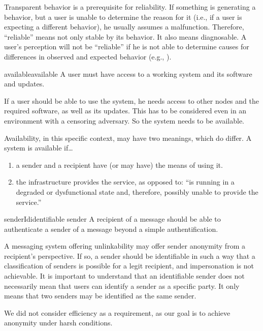 Transparent behavior is a prerequisite for reliability. If something is generating a  behavior, but a user is unable to determine the reason for it (i.e., if a user is expecting a different behavior), he usually assumes a malfunction. Therefore, ``reliable'' means not only stable by its behavior. It also means diagnosable. A user's perception will not be ``reliable'' if he is not able to determine causes for differences in observed and expected behavior (e.g., \cite{nicholson2003assessing}).

\begin{requirement}{available}{available}
	A user must have access to a working system and its software and updates.
\end{requirement}

If a user should be able to use the system, he needs access to other nodes and the required software, as well as its updates. This has to be considered even in an environment with a censoring adversary. So the system needs to be available.

Availability, in this specific context, may have two meanings, which do differ. A system is available if\ldots
\begin{enumerate}
	\item a sender and a recipient have (or may have) the means of using it.
	\item the infrastructure provides the service, as opposed to: ``is running in a degraded or dysfunctional state and, therefore, possibly unable to provide the service.''
\end{enumerate}

\begin{requirement}{senderId}{identifiable sender}
	A recipient of a message should be able to authenticate a sender of a message beyond a simple authentification.
\end{requirement}

A messaging system offering unlinkability may offer sender anonymity from a recipient's perspective. If so, a sender should be identifiable in such a way that a classification of senders is possible for a legit recipient, and impersonation is not achievable. It is important to understand that an identifiable sender does not necessarily mean that users can identify a sender as a specific party. It only means that two senders may be identified as the same sender.

We did not consider efficiency as a requirement, as our goal is to achieve anonymity under harsh conditions. 

